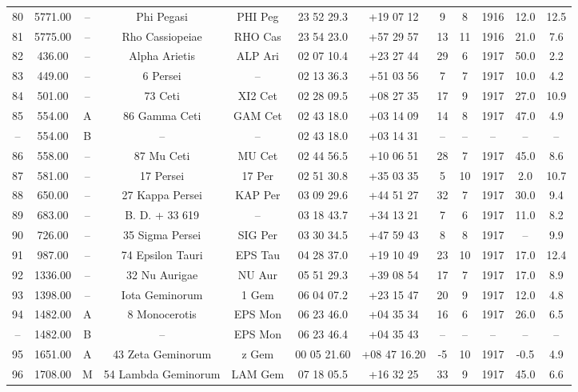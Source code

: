 \begin{table}
\begin{tabular}{cccccccccccc}
80 & 5771.00 & -- & Phi Pegasi & PHI Peg & 23 52 29.3 & +19 07 12 & 9 & 8 & 1916 & 12.0 & 12.5 \\
81 & 5775.00 & -- & Rho Cassiopeiae & RHO Cas & 23 54 23.0 & +57 29 57 & 13 & 11 & 1916 & 21.0 & 7.6 \\
82 & 436.00 & -- & Alpha Arietis & ALP Ari & 02 07 10.4 & +23 27 44 & 29 & 6 & 1917 & 50.0 & 2.2 \\
83 & 449.00 & -- & 6 Persei & -- & 02 13 36.3 & +51 03 56 & 7 & 7 & 1917 & 10.0 & 4.2 \\
84 & 501.00 & -- & 73 Ceti & XI2 Cet & 02 28 09.5 & +08 27 35 & 17 & 9 & 1917 & 27.0 & 10.9 \\
85 & 554.00 & A & 86 Gamma Ceti & GAM Cet & 02 43 18.0 & +03 14 09 & 14 & 8 & 1917 & 47.0 & 4.9 \\
-- & 554.00 & B & -- & -- & 02 43 18.0 & +03 14 31 & -- & -- & -- & -- & -- \\
86 & 558.00 & -- & 87 Mu Ceti & MU Cet & 02 44 56.5 & +10 06 51 & 28 & 7 & 1917 & 45.0 & 8.6 \\
87 & 581.00 & -- & 17 Persei & 17 Per & 02 51 30.8 & +35 03 35 & 5 & 10 & 1917 & 2.0 & 10.7 \\
88 & 650.00 & -- & 27 Kappa Persei & KAP Per & 03 09 29.6 & +44 51 27 & 32 & 7 & 1917 & 30.0 & 9.4 \\
89 & 683.00 & -- & B. D. + 33  619 & -- & 03 18 43.7 & +34 13 21 & 7 & 6 & 1917 & 11.0 & 8.2 \\
90 & 726.00 & -- & 35 Sigma Persei & SIG Per & 03 30 34.5 & +47 59 43 & 8 & 8 & 1917 & -- & 9.9 \\
91 & 987.00 & -- & 74 Epsilon Tauri & EPS Tau & 04 28 37.0 & +19 10 49 & 23 & 10 & 1917 & 17.0 & 12.4 \\
92 & 1336.00 & -- & 32 Nu Aurigae & NU Aur & 05 51 29.3 & +39 08 54 & 17 & 7 & 1917 & 17.0 & 8.9 \\
93 & 1398.00 & -- & Iota Geminorum & 1 Gem & 06 04 07.2 & +23 15 47 & 20 & 9 & 1917 & 12.0 & 4.8 \\
94 & 1482.00 & A & 8 Monocerotis & EPS Mon & 06 23 46.0 & +04 35 34 & 16 & 6 & 1917 & 26.0 & 6.5 \\
-- & 1482.00 & B & -- & EPS Mon & 06 23 46.4 & +04 35 43 & -- & -- & -- & -- & -- \\
95 & 1651.00 & A & 43 Zeta Geminorum & z Gem & 00 05 21.60 & +08 47 16.20 & -5 & 10 & 1917 & -0.5 & 4.9 \\
96 & 1708.00 & M & 54 Lambda Geminorum & LAM Gem & 07 18 05.5 & +16 32 25 & 33 & 9 & 1917 & 45.0 & 6.6 \\

\end{tabular}
\end{table}

